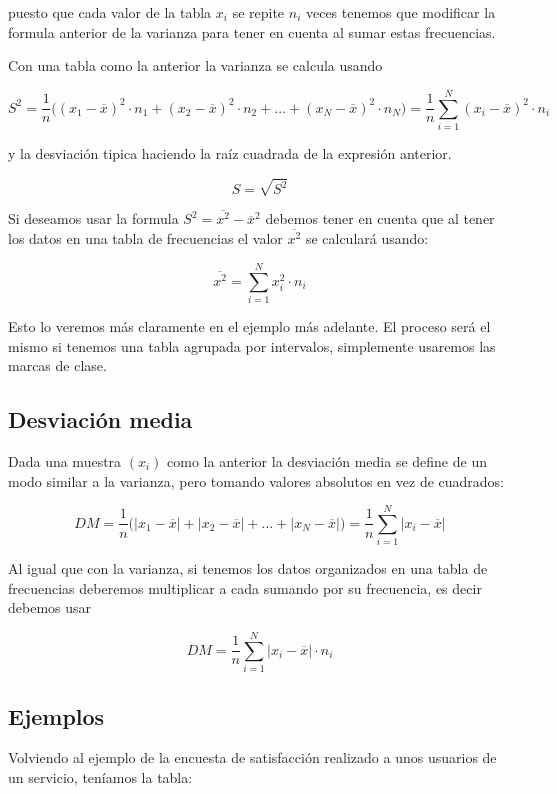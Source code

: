 \documentclass[]{article}
\theoremstyle{plain}
\theoremstyle{definition}
\theoremstyle{definition} %
\begin{document}
puesto que cada valor de la tabla \(x_i\) se repite \(n_i\) veces
tenemos que modificar la formula anterior de la varianza para tener en
cuenta al sumar estas frecuencias.

Con una tabla como la anterior la varianza se calcula usando

\[S^2 = \frac{1}{n}\big( (x_1 - \overline x)^2 \cdot n_1 + (x_2 - \overline x)^2 \cdot n_2 + \ldots + (x_N - \overline x)^2 \cdot n_N \big)= \frac{1}{n}\sum^N_{i=1} (x_i - \overline x)^2 \cdot n_i\]

y la desviación tipica haciendo la raíz cuadrada de la expresión
anterior.

\[S = \sqrt{S^2}\]

Si deseamos usar la formula \(S^2 = \overline{x^2} - \overline x^2\)
debemos tener en cuenta que al tener los datos en una tabla de
frecuencias el valor \(\overline{x^2}\) se calculará usando:

\[\overline{x^2} = \sum^N_{i=1} x^2_i \cdot n_i\]

Esto lo veremos más claramente en el ejemplo más adelante. El proceso
será el mismo si tenemos una tabla agrupada por intervalos, simplemente
usaremos las marcas de clase.

\hypertarget{desviaciuxf3n-media}{%
\subsection{Desviación media}\label{desviaciuxf3n-media}}

Dada una muestra \((x_i)\) como la anterior la desviación media se
define de un modo similar a la varianza, pero tomando valores absolutos
en vez de cuadrados:

\[DM = \frac{1}{n}\big( |x_1 - \overline x| + |x_2 - \overline x| + \ldots + |x_N - \overline x| \big)= \frac{1}{n}\sum^N_{i=1} |x_i - \overline x|\]

Al igual que con la varianza, si tenemos los datos organizados en una
tabla de frecuencias deberemos multiplicar a cada sumando por su
frecuencia, es decir debemos usar

\[DM = \frac{1}{n}\sum^N_{i=1} |x_i - \overline x| \cdot n_i\]

\hypertarget{ejemplos-2}{%
\subsection{Ejemplos}\label{ejemplos-2}}

Volviendo al ejemplo de la encuesta de satisfacción realizado a unos
usuarios de un servicio, teníamos la tabla:
\end{document}
